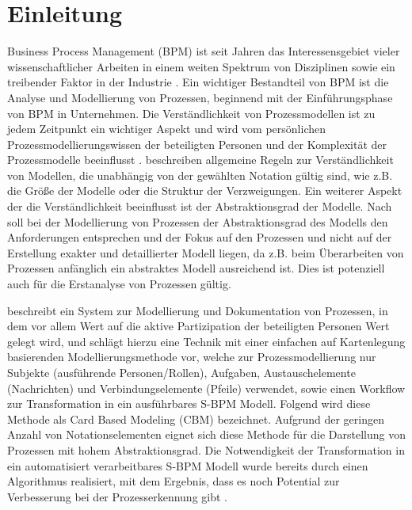 %
%
% 
% 
% 

\chapter{Einleitung}
\label{cha:einleitung}
Business Process Management (BPM) ist seit Jahren das Interessensgebiet vieler wissenschaftlicher Arbeiten in einem weiten Spektrum von Disziplinen sowie ein treibender Faktor in der Industrie \cite{vanderAalst2016}. Ein wichtiger Bestandteil von BPM ist die Analyse und Modellierung von Prozessen, beginnend mit der Einführungsphase von BPM in Unternehmen. Die Verständlichkeit von Prozessmodellen ist zu jedem Zeitpunkt ein wichtiger Aspekt und wird vom persönlichen Prozessmodellierungswissen der beteiligten Personen und der Komplexität der Prozessmodelle beeinflusst \cite{reijers_study_2011}. \citet{MENDLING2010127} beschreiben allgemeine Regeln zur Verständlichkeit von Modellen, die unabhängig von der gewählten Notation gültig sind, wie z.B. die Größe der Modelle oder die Struktur der Verzweigungen. Ein weiterer Aspekt der die Verständlichkeit beeinflusst ist der Abstraktionsgrad der Modelle. Nach \citet{vanderAalst2016} soll bei der Modellierung von Prozessen der Abstraktionsgrad des Modells den Anforderungen entsprechen und der Fokus auf den Prozessen und nicht auf der Erstellung exakter und detaillierter Modell liegen, da z.B. beim Überarbeiten von Prozessen anfänglich ein abstraktes Modell ausreichend ist. Dies ist potenziell auch für die Erstanalyse von Prozessen gültig. 

\citet{Oppl:2015:ASB:2723839.2723841} beschreibt ein System zur Modellierung und Dokumentation von Prozessen, in dem vor allem Wert auf die aktive Partizipation der beteiligten Personen Wert gelegt wird, und schlägt hierzu eine Technik mit einer einfachen auf Kartenlegung basierenden Modellierungsmethode vor, welche zur Prozessmodellierung nur Subjekte (ausführende Personen/Rollen), Aufgaben, Austauschelemente (Nachrichten) und Verbindungselemente (Pfeile) verwendet, sowie einen Workflow zur Transformation in ein ausführbares S-BPM Modell. Folgend wird diese Methode als Card Based Modeling (CBM) bezeichnet. Aufgrund der geringen Anzahl von Notationselementen eignet sich diese Methode für die Darstellung von Prozessen mit hohem Abstraktionsgrad. Die Notwendigkeit der Transformation in ein automatisiert verarbeitbares S-BPM Modell wurde bereits durch einen Algorithmus realisiert, mit dem Ergebnis, dass es noch Potential zur Verbesserung bei der Prozesserkennung gibt \cite{max}.

